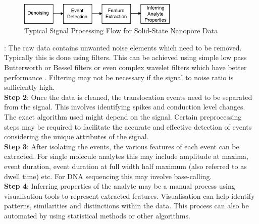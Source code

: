 \documentclass[journal]{IEEEtran}
\begin{document}
\begin{figure}[!t]
\centering
\includegraphics[width=3in]{TypSigFlow.png}
\caption{Typical Signal Processing Flow for Solid-State Nanopore Data}
\label{fig_1}
\end{figure}

: The raw data contains unwanted noise elements which need to be removed. Typically this is done using filters. This can be achieved using simple low pass Butterworth or Bessel filters or even complex wavelet filters which have better performance \cite{shekarWaveletDenoisingHighBandwidth2019}. Filtering may not be necessary if the signal to noise ratio is sufficiently high. \\
{\bf{Step 2}}: Once the data is cleaned, the translocation events need to be separated from the signal. This involves identifying spikes and conduction level changes. The exact algorithm used might depend on the signal. Certain preprocessing steps may be required to facilitate the accurate and effective detection of events considering the unique attributes of the signal. \\
{\bf{Step 3}}: After isolating the events, the various features of each event can be extracted. For single molecule analytes this may include amplitude at maxima, event duration, event duration at full width half maximum (also referred to as dwell time) etc. For DNA sequencing this may involve base-calling. \\
{\bf{Step 4}}: Inferring properties of the analyte may be a manual process using visualisation tools to represent extracted features. Visualisation can help identify patterns, similarities and distinctions within the data. This process can also be automated by using statistical methods or other algorithms.
\end{document}
